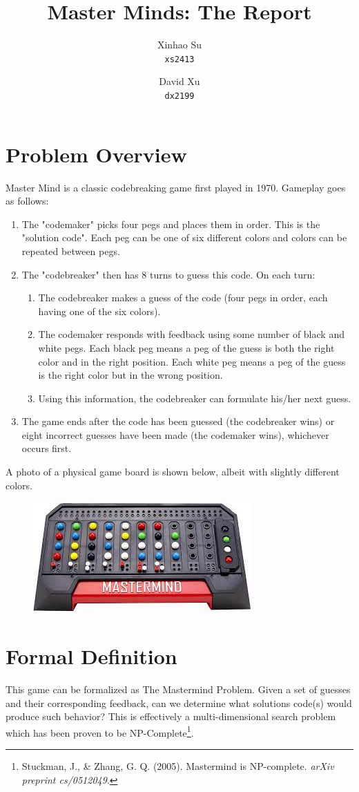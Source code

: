 \documentclass{article}
\title{Master Minds: The Report}
\author{
	Xinhao Su\\
	\texttt{xs2413}
	\and
	David Xu\\
	\texttt{dx2199}
}
\begin{document}
\maketitle
\section{Problem Overview}
Master Mind is a classic codebreaking game first played in 1970. Gameplay goes as follows:
\begin{enumerate}
	\item The "codemaker" picks four pegs and places them in order. This is the "solution code". Each peg can be one of six different colors and colors can be repeated between pegs.
	\item The "codebreaker" then has 8 turns to guess this code. On each turn:
	\begin {enumerate}
		\item The codebreaker makes a guess of the code (four pegs in order, each having one of the six colors).
		\item The codemaker responds with feedback using some number of black and white pegs. Each black peg means a peg of the guess is both the right color and in the right position. Each white peg means a peg of the guess is the right color but in the wrong position.
		\item Using this information, the codebreaker can formulate his/her next guess.
	\end{enumerate}
	\item The game ends after the code has been guessed (the codebreaker wins) or eight incorrect guesses have been made (the codemaker wins), whichever occurs first.
\end{enumerate}

A photo of a physical game board is shown below, albeit with slightly different colors.
\begin{figure}[h]
	\centering
	\includegraphics{mm.jpeg}
\end{figure}


\section{Formal Definition}
This game can be formalized as The Mastermind Problem. Given a set of guesses and their corresponding feedback, can we determine what solutions code(s) would produce such behavior? This is effectively a multi-dimensional search problem which has been proven to be NP-Complete\footnote{Stuckman, J., \& Zhang, G. Q. (2005). Mastermind is NP-complete. \textit{arXiv preprint cs/0512049}.}.
\end{document}
